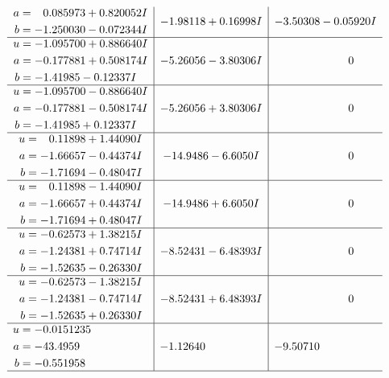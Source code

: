 \documentclass[1p]{elsarticle_modified}
\theoremstyle{definition}
\begin{document}
$$\begin{array}{c|c|c}
\begin{aligned}
a &= \phantom{-}0.085973 + 0.820052 I \\
b &= -1.250030 - 0.072344 I\end{aligned}
 & -1.98118 + 0.16998 I & -3.50308 - 0.05920 I \\ \hline\begin{aligned}
u &= -1.095700 + 0.886640 I \\
a &= -0.177881 + 0.508174 I \\
b &= -1.41985 - 0.12337 I\end{aligned}
 & -5.26056 - 3.80306 I & \phantom{-0.000000 } 0 \\ \hline\begin{aligned}
u &= -1.095700 - 0.886640 I \\
a &= -0.177881 - 0.508174 I \\
b &= -1.41985 + 0.12337 I\end{aligned}
 & -5.26056 + 3.80306 I & \phantom{-0.000000 } 0 \\ \hline\begin{aligned}
u &= \phantom{-}0.11898 + 1.44090 I \\
a &= -1.66657 - 0.44374 I \\
b &= -1.71694 - 0.48047 I\end{aligned}
 & -14.9486 - 6.6050 I & \phantom{-0.000000 } 0 \\ \hline\begin{aligned}
u &= \phantom{-}0.11898 - 1.44090 I \\
a &= -1.66657 + 0.44374 I \\
b &= -1.71694 + 0.48047 I\end{aligned}
 & -14.9486 + 6.6050 I & \phantom{-0.000000 } 0 \\ \hline\begin{aligned}
u &= -0.62573 + 1.38215 I \\
a &= -1.24381 + 0.74714 I \\
b &= -1.52635 - 0.26330 I\end{aligned}
 & -8.52431 - 6.48393 I & \phantom{-0.000000 } 0 \\ \hline\begin{aligned}
u &= -0.62573 - 1.38215 I \\
a &= -1.24381 - 0.74714 I \\
b &= -1.52635 + 0.26330 I\end{aligned}
 & -8.52431 + 6.48393 I & \phantom{-0.000000 } 0 \\ \hline\begin{aligned}
u &= -0.0151235\phantom{ +0.000000I} \\
a &= -43.4959\phantom{ +0.000000I} \\
b &= -0.551958\phantom{ +0.000000I}\end{aligned}
 & -1.12640\phantom{ +0.000000I} & -9.50710\phantom{ +0.000000I}\\
 \hline 
 \end{array}$$\newpage\newpage\renewcommand{\arraystretch}{1}
\end{document}
